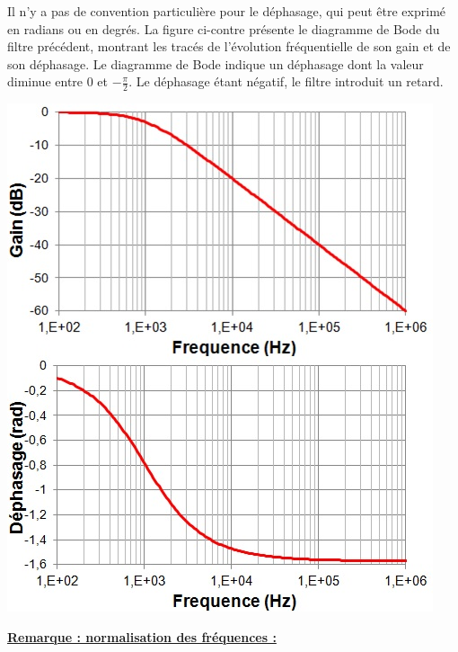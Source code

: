 	\begin{minipage}[l]{0.4\linewidth}
		Il n'y a pas de convention particulière pour le déphasage, qui peut être exprimé en radians ou en degrés. La figure ci-contre présente le diagramme de Bode du filtre précédent, montrant les tracés de l'évolution fréquentielle de son gain et de son déphasage. Le diagramme de Bode indique un déphasage dont la valeur diminue entre 0 et $-\frac{\pi}{2}$. Le déphasage étant négatif, le filtre introduit un retard.	
	\end{minipage} \hfill
	\begin{minipage}[c]{0.50\linewidth}
			\includegraphics[scale=0.6]{images/Bode_passe-bas.jpg}
	\end{minipage}

	\vspace{1\baselineskip}

		\textbf{\underline{Remarque : normalisation des fréquences :}}
	
